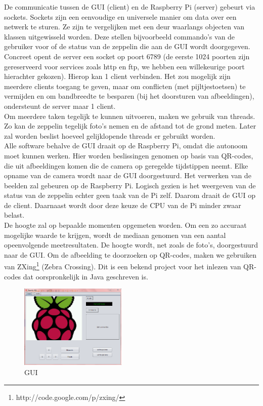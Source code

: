 \documentclass[tt]{penoverslag}
\begin{document}
De communicatie tussen de GUI (client) en de Raspberry Pi (server) gebeurt via sockets. Sockets zijn een eenvoudige en universele manier om data over een netwerk te sturen. Ze zijn te vergelijken met een deur waarlangs objecten van klassen uitgewisseld worden. Deze stellen bijvoorbeeld commando's van de gebruiker voor of de status van de zeppelin die aan de GUI wordt doorgegeven. Concreet opent de server een socket op poort 6789 (de eerste 1024 poorten zijn gereserveerd voor services zoals http en ftp, we hebben een willekeurige poort hierachter gekozen). Hierop kan 1 client verbinden. Het zou mogelijk zijn meerdere clients toegang te geven, maar om conflicten (met pijltjestoetsen) te vermijden en om bandbreedte te besparen (bij het doorsturen van afbeeldingen), ondersteunt de server maar 1 client.  \\

Om meerdere taken tegelijk te kunnen uitvoeren, maken we gebruik van threads. Zo kan de zeppelin tegelijk foto's nemen en de afstand tot de grond meten. Later zal worden beslist hoeveel gelijklopende threads er gebruikt worden. \\

Alle software behalve de GUI draait op de Raspberry Pi, omdat die autonoom moet kunnen werken. Hier worden beslissingen genomen op basis van QR-codes, die uit afbeeldingen komen die de camera op geregelde tijdstippen neemt. Elke opname van de camera wordt naar de GUI doorgestuurd. Het verwerken van de beelden zal gebeuren op de Raspberry Pi. Logisch gezien is het weergeven van de status van de zeppelin echter geen taak van de Pi zelf. Daarom draait de GUI op de client. Daarnaast wordt door deze keuze de CPU van de Pi minder zwaar belast. \\

De hoogte zal op bepaalde momenten opgemeten worden. Om een zo accuraat mogelijke waarde te krijgen, wordt de mediaan genomen van een aantal opeenvolgende meetresultaten. De hoogte wordt, net zoals de foto's, doorgestuurd naar de GUI. Om de afbeelding te doorzoeken op QR-codes, maken we gebruiken van ZXing\footnote{http://code.google.com/p/zxing/} (Zebra Crossing). Dit is een bekend project voor het inlezen van QR-codes dat oorspronkelijk in Java geschreven is. \\

\begin{figure}[ht!]
\centering
\includegraphics[height=40mm]{GUI.png}
\caption{GUI}
\label{GUI}
\end{figure}
\end{document}
